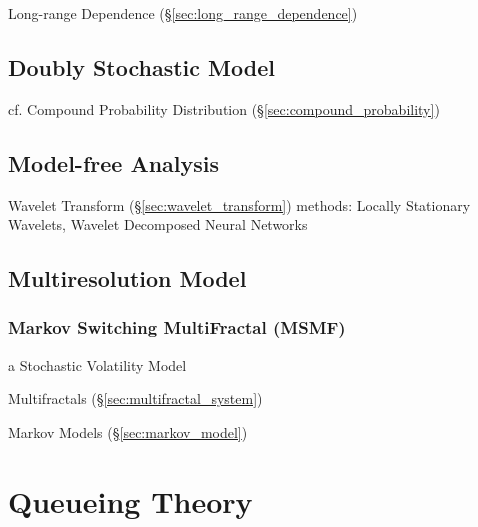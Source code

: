 Long-range Dependence (\S\ref{sec:long_range_dependence})



\subsection{Doubly Stochastic Model}\label{sec:doubly_stochastic}

cf. Compound Probability Distribution (\S\ref{sec:compound_probability})



\subsection{Model-free Analysis}\label{sec:model_free_analysis}

Wavelet Transform (\S\ref{sec:wavelet_transform}) methods: Locally Stationary
Wavelets, Wavelet Decomposed Neural Networks



\subsection{Multiresolution Model}\label{sec:multiresolution_model}

\subsubsection{Markov Switching MultiFractal (MSMF)}\label{sec:msmf}


a Stochastic Volatility Model

\fist Multifractals (\S\ref{sec:multifractal_system})

\fist Markov Models (\S\ref{sec:markov_model})



\section{Queueing Theory}\label{sec:queueing_theory}

